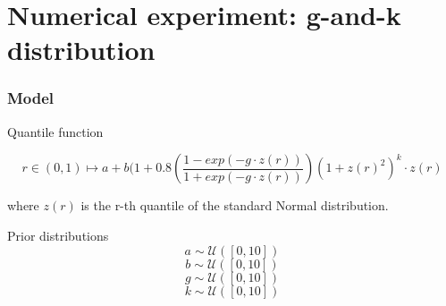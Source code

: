 \documentclass{beamer}
\begin{document}
\section{Numerical experiment: g-and-k distribution}

\begin{frame}[plain]{}
	\sectionpage
\end{frame}
	\begin{frame}
		\frametitle{Model}
		\begin{block}{Quantile function}
			
			$$ r \in (0,1) \longmapsto   a + b (1+0.8\left(\frac{1-exp(-g \cdot z(r))}{1+exp(-g\cdot z(r))}\right)(1+ z(r)^{2})^k\cdot z(r)  $$
		\end{block}	
		where $ z(r)$ is the r-th quantile of the standard Normal distribution. 
		\begin{block}{Prior distributions}
			$$ a \sim \mathcal{U}([0,10])	$$
			$$ b \sim \mathcal{U}([0,10])	$$
			$$ g \sim \mathcal{U}([0,10])	$$
			$$k \sim \mathcal{U}([0,10])    $$
		\end{block}
	\end{frame}
	
	
	
\end{document}
